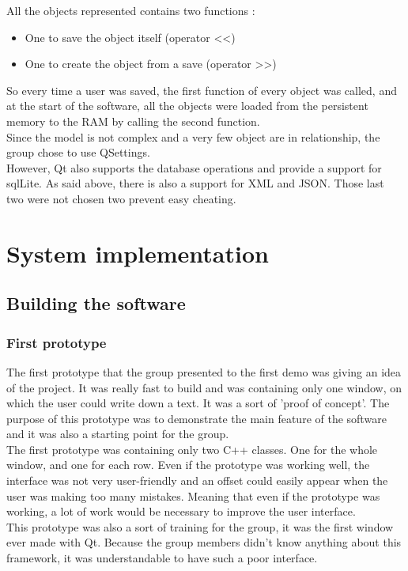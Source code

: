 All the objects represented contains two functions :
\begin{itemize}
	\item One to save the object itself (operator <<)
	\item One to create the object from a save (operator >>)
\end{itemize}

So every time a user was saved, the first function of every object was called, and at the start of the software, all the objects were loaded from the persistent memory to the RAM by calling the second function.\\
Since the model is not complex and a very few object are in relationship, the group chose to use QSettings. \\
However, Qt also supports the database operations and provide a support for sqlLite. As said above, there is also a support for XML and JSON. Those last two were not chosen two prevent easy cheating.


\part{System implementation}
\chapter{Building the software}
\section{First prototype}
The first prototype that the group presented to the first demo was giving an idea of the project. It was really fast to build and was containing only one window, on which the user could write down a text. It was a sort of 'proof of concept'. The purpose of this prototype was to demonstrate the main feature of the software and it was also a starting point for the group.\\
The first prototype was containing only two C++ classes. One for the whole window, and one for each row. Even if the prototype was working well, the interface was not very user-friendly and an offset could easily appear when the user was making too many mistakes.
Meaning that even if the prototype was working, a lot of work would be necessary to improve the user interface. \\
This prototype was also a sort of training for the group, it was the first window ever made with Qt. Because the group members didn't know anything about this framework, it was understandable to have such a poor interface.

